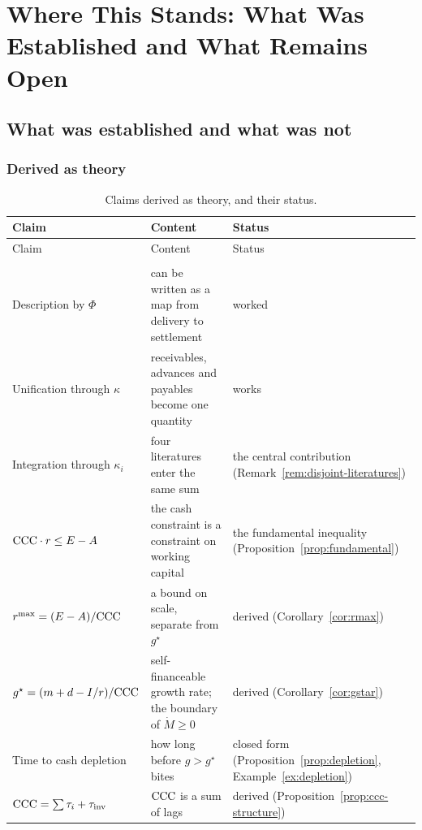 \chapter{Where This Stands: What Was Established and What Remains Open}
\label{ch:conclusion}

\section{What was established and what was not}

\subsection{Derived as theory}

\begin{longtable}{@{}>{\raggedright\arraybackslash}p{}>{\raggedright\arraybackslash}p{}>{\raggedright\arraybackslash}p{}@{}}
\caption{Claims derived as theory, and their status.}\label{tab:theory-achievements}\\
\toprule
Claim & Content & Status \\
\midrule
\endfirsthead
\toprule
Claim & Content & Status \\
\midrule
\endhead
\midrule
\multicolumn{3}{r}{\footnotesize(continued)}\\
\endfoot
\bottomrule
\endlastfoot
Description by $\Phi$ & can be written as a map from delivery to settlement & worked \\
Unification through $\kappa$ & receivables, advances and payables become one quantity & works \\
Integration through $\kappa_i$ & four literatures enter the same sum & the central contribution (Remark~\ref{rem:disjoint-literatures}) \\
$\mathrm{CCC}\cdot r\leq E-A$ & the cash constraint is a constraint on working capital & the fundamental inequality (Proposition~\ref{prop:fundamental}) \\
$r^{\max}=(E-A)/\mathrm{CCC}$ & a bound on scale, separate from $g^\star$ & derived (Corollary~\ref{cor:rmax}) \\
$g^\star = (m+d-I/r)/\mathrm{CCC}$ & self-financeable growth rate; the boundary of $\dot M\geq 0$ & derived (Corollary~\ref{cor:gstar}) \\
Time to cash depletion & how long before $g>g^\star$ bites & closed form (Proposition~\ref{prop:depletion}, Example~\ref{ex:depletion}) \\
$\mathrm{CCC}=\sum\tau_i+\tau_{\mathrm{inv}}$ & $\mathrm{CCC}$ is a sum of lags & derived (Proposition~\ref{prop:ccc-structure}) \\

\end{longtable}
